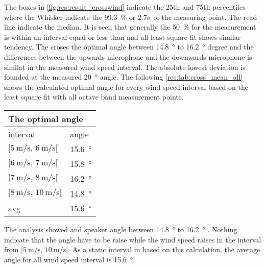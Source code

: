  
 

 
The boxes in \autoref{fig:res:result_crosswind} indicate the 25th and 75th percentiles where the Whisker indicate the \SI{99.3}{\percent} or $2.7\sigma$ of the measuring point. The read line indicate the median. It is seen that generally the \SI{50}{\percent} for the measurement is within an interval equal or less than  and all least square fit shows similar tendency. The croses the optimal angle between \SI{14.8}{\degree} to \SI{16.2}{\degree}  degree and the differences between the upwards microphone and the downwards microphone is similat in the measured wind speed interval. The absolute lowest deviation is founded at the measured \SI{20}{\degree} angle. The following \autoref{res:tab:cross_mean_all} shows the calculated optimal angle for every wind speed interval based on the least square fit with all octave band measurement points.
 
 
 \begin{table}[H]
 \centering
\begin{tabular}{l|l}
\multicolumn{2}{l}{The optimal angle}      \\ \hline
interval & angle \\ \hline
  $[\SI{5}{\meter\per\second},\, \SI{6}{\meter\per\second}[ $       &   \SI{15.6}{\degree}    \\
   $[\SI{6}{\meter\per\second},\, \SI{7}{\meter\per\second}[ $     &   \SI{15.8}{\degree}     \\
  $[\SI{7}{\meter\per\second},\, \SI{8}{\meter\per\second}[ $       &    \SI{16.2}{\degree}    \\
   $[\SI{8}{\meter\per\second},\, \SI{10}{\meter\per\second}[ $      &     \SI{14.8}{\degree}  \\ \hline
    avg      &     \SI{15.6}{\degree} 
\end{tabular}
\label{res:tab:cross_mean_all}
\end{table}     

The analysis showed and speaker angle between \SI{14.8}{\degree} to  \SI{16.2}{\degree} . Nothing indicate that the angle have to be raise while the wind speed raises in the interval from $[\SI{5}{\meter\per\second},\, \SI{10}{\meter\per\second}[ $. As a static interval in based on this calculation, the average angle for all wind speed interval is \SI{15.6}{\degree}.

